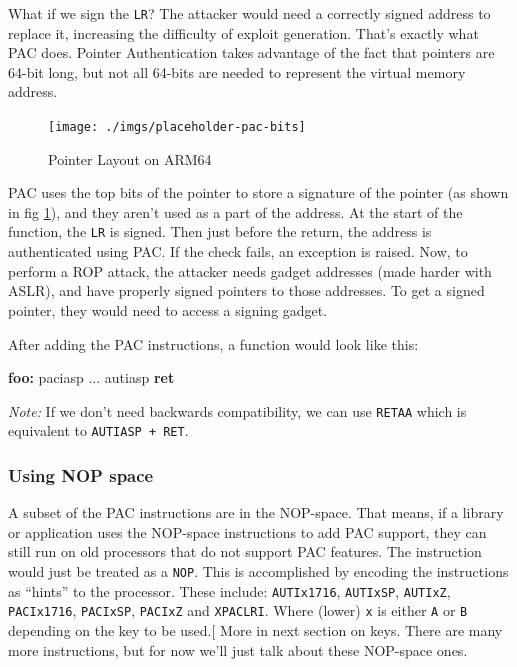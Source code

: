 \documentclass[a4paper, nobind]{templates/ociamthesis}
\newenvironment{Shaded}{\begin{snugshade}}{\end{snugshade}}
\newcommand{\ControlFlowTok}[1]{\textcolor[rgb]{0.13,0.29,0.53}{\textbf{#1}}}
\newcommand{\FunctionTok}[1]{\textcolor[rgb]{0.13,0.29,0.53}{\textbf{#1}}}
\newcommand{\NormalTok}[1]{#1}
\renewenvironment{Shaded}
{
  \vspace{10pt}%
  \begin{snugshade}%
}{%
  \end{snugshade}%
  \vspace{8pt}%
}
\begin{document}
What if we sign the \texttt{LR}? The attacker would need a correctly signed address to replace it,
increasing the difficulty of exploit generation.
That's exactly what PAC does. Pointer Authentication
takes advantage of the fact that pointers are 64-bit long, but not all 64-bits
are needed to represent the virtual memory address.

\begin{figure}

{\centering \texttt{[image: ./imgs/placeholder-pac-bits]} 

}

\caption{Pointer Layout on ARM64}\label{fig:pac-bits}
\end{figure}

PAC uses the top bits of the pointer to store a signature of the pointer
(as shown in fig \ref{fig:pac-bits}), and they aren't
used as a part of the address. At the start of the function, the \texttt{LR} is signed.
Then just before the return, the address is authenticated using PAC. If the check fails,
an exception is raised. Now, to perform a ROP attack, the attacker needs gadget addresses
(made harder with ASLR), and have properly signed pointers to those addresses.
To get a signed pointer, they would need to access a signing gadget.

After adding the PAC instructions, a function would look like this:

\begin{Shaded}
\begin{Highlighting}[]
\FunctionTok{foo:}
\NormalTok{  paciasp}
\NormalTok{  ...}
\NormalTok{  autiasp}
  \ControlFlowTok{ret}
\end{Highlighting}
\end{Shaded}

\emph{Note:} If we don't need backwards compatibility, we can use \texttt{RETAA} which is equivalent to \texttt{AUTIASP\ +\ RET}.

\subsubsection{Using NOP space}\label{using-nop-space}

A subset of the PAC instructions are in the NOP-space. That means, if a
library or application uses the NOP-space instructions to add PAC support,
they can still run on old processors that do not support PAC features.
The instruction would just be treated as a \texttt{NOP}.
This is accomplished by encoding the instructions as ``hints'' to the processor.
These include: \texttt{AUTIx1716}, \texttt{AUTIxSP}, \texttt{AUTIxZ}, \texttt{PACIx1716}, \texttt{PACIxSP}, \texttt{PACIxZ} and \texttt{XPACLRI}.
Where (lower) \texttt{x} is either \texttt{A} or \texttt{B} depending on the key to be used.{[}\citeproc{ref-sipearl}{25}{]}
More in next section on keys. There are many more instructions,
but for now we'll just talk about these NOP-space ones.
\end{document}
